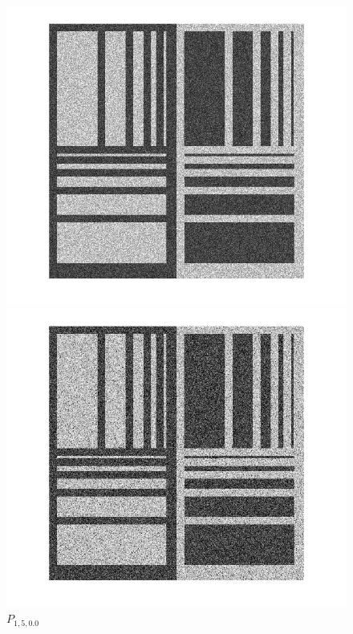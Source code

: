 \documentclass[12pt,a4paper]{article}
\begin{document}
\begin{figure}[!htb]
	\caption{$P_{1,3,0.0}$}\label{fig:awesome_image1}
\endminipage\hfill
{}%
  \includegraphics[width=\linewidth]{Eq_Phantom_0p000_1_4_1_histeq.jpg}
	\caption{ $P_{1,4,0.0}$}\label{fig:awesome_image1}
\endminipage
{}%
  \includegraphics[width=\linewidth]{Eq_Phantom_0p000_1_5_1_histeq.jpg}
	\caption{ $P_{1,5,0.0}$}\label{fig:awesome_image1}
\endminipage
\end{figure}
\end{document}
